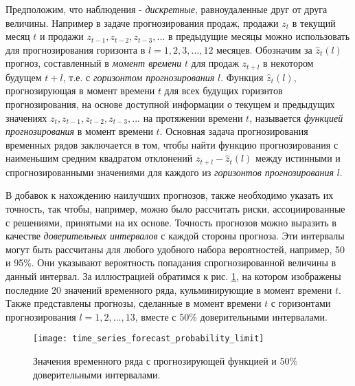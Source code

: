 Предположим, что наблюдения - \textit{дискретные}, равноудаленные друг от друга величины. 
Например в задаче прогнозирования продаж, продажи $z_t$ в текущий месяц $t$ и продажи 
$z_{t-1}, z_{t-2}, z_{t-3}, ...$ в предыдущие месяцы можно использовать для 
прогнозирования горизонта в $l = 1, 2, 3, ..., 12$ месяцев. Обозначим за $\hat{z}_t (l)$ 
прогноз, составленный в \textit{момент времени} $t$ для продаж $z_{t+l}$ в некотором будущем $t+l$, т.е.
с \textit{горизонтом прогнозирования} $l$. Функция $\hat{z}_t (l)$, прогнозирующая в момент времени 
$t$ для всех будущих горизнтов прогнозирования, на основе доступной информации о 
текущем и предыдущих значениях $z_t, z_{t-1}, z_{t-2}, z_{t-3}, ...$ на протяжении времени $t$, 
называется \textit{функцией прогнозирования} в момент времени $t$. Основная задача 
прогнозирования временных рядов заключается в том, чтобы найти функцию прогнозирования с 
наименьшим средним квадратом отклонений $z_{t+l} - \hat{z}_t (l)$ между истинными и 
спрогнозированными значениями для каждого из \textit{горизонтов прогнозирования} $l$. 

В добавок к нахождению наилучших прогнозов, также необходимо указать их точность, так 
чтобы, например, можно было рассчитать риски, ассоциированные с решениями, принятыми на 
их основе. Точность прогнозов можно выразить в качестве \textit{доверительных интервалов} 
с каждой стороны прогноза. Эти интервалы могут быть рассчитаны для любого удобного набора 
вероятностей, например, 50 и 95\%. Они указывают вероятность попадания спрогнозированной 
величины в данный интервал. За иллюстрацией обратимся к рис. \ref{fig:time_series_forecast_probability_limit}, 
на котором изображены последние 20 значений временного ряда, кульминирующие в момент времени $t$. 
Также представлены прогнозы, сделанные в момент времени $t$ с горизонтами прогнозирования 
$l = 1, 2, ..., 13$, вместе с 50\% доверительными интервалами.

\begin{figure}[h!]
    \centering
    \texttt{[image: time\_series\_forecast\_probability\_limit]}
    \caption{Значения временного ряда с прогнозирующей функцией и 50\% доверительными интервалами.}
    \label{fig:time_series_forecast_probability_limit}
\end{figure}


